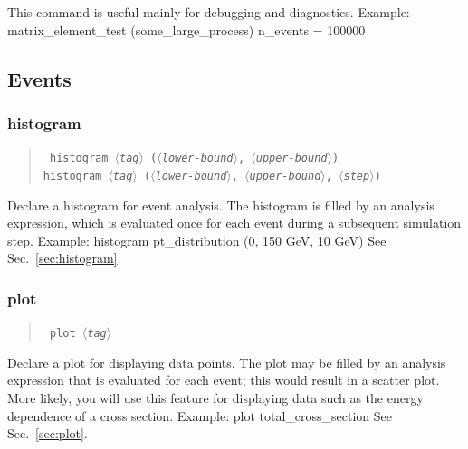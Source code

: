 \documentclass[12pt]{book}
\newenvironment{code}%
  {\begingroup\footnotesize
   \quote
   \verbatim}%
  {\endverbatim
   \endquote
   \endgroup\noindent}
\newenvironment{syntax}%
  {\begin{quote}
   \begin{flushleft}\tt}%
  {\end{flushleft}
   \end{quote}}
\newcommand{\var}[1]{$\langle$\textit{#1}$\rangle$}
\begin{document}
This command is useful mainly for debugging and diagnostics.  Example:
\begin{code}
matrix_element_test (some_large_process) { n_events = 100000 }
\end{code}


\subsection{Events}

\subsubsection{histogram}
\begin{syntax}
histogram \var{tag} (\var{lower-bound}, \var{upper-bound}) \\
histogram \var{tag} (\var{lower-bound}, \var{upper-bound}, \var{step}) \\
\end{syntax}
Declare a histogram for event analysis.  The histogram is filled by an
analysis expression, which is evaluated once for each event during a
subsequent simulation step.  Example:
\begin{code}
histogram pt_distribution (0, 150 GeV, 10 GeV)
\end{code}
See Sec.~\ref{sec:histogram}.


\subsubsection{plot}
\begin{syntax}
plot \var{tag}
\end{syntax}
Declare a plot for displaying data points.  The plot may be filled by an
analysis expression that is evaluated for each event; this would result in a
scatter plot.  More likely, you will use this feature for displaying data such
as the energy dependence of a cross section.  Example:
\begin{code}
plot total_cross_section
\end{code}
See Sec.~\ref{sec:plot}.
\end{document}
